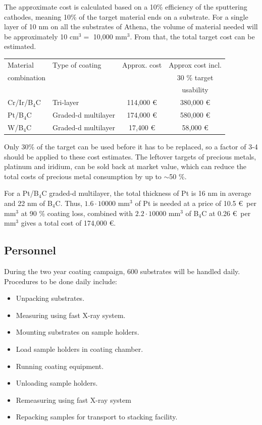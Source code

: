 The approximate cost is calculated based on a 10\% efficiency of the sputtering cathodes, meaning 10\% of the target material ends on a substrate. For a single layer of 10 nm on all the substrates of Athena, the volume of material needed will be approximately 10 cm$^3 = $ 10,000 mm$^3$. From that, the total target cost can be estimated.

\begin{table}[htbp]
	\centering
\begin{tabular}{l|l|c|c}
Material 	& Type of coating & Approx. cost & Approx cost incl. \\
combination	&	&	&	30 \% target \\
&	&	&	usability\\
\hline
\hline
Cr/Ir/B$_4$C & Tri-layer & 114,000 \euro & 380,000 \euro \\
\hline
Pt/B$_4$C & Graded-d multilayer & 174,000 \euro & 580,000 \euro\\
\hline
W/B$_4$C & Graded-d multilayer & 17,400 \euro & 58,000 \euro \\
\end{tabular}
\end{table}

Only 30\% of the target can be used before it has to be replaced, so a factor of 3-4 should be applied to these cost estimates. The leftover targets of precious metals, platinum and iridium, can be sold back at market value, which can reduce the total costs of precious metal consumption by up to $\sim$50 \%.

For a Pt/B$_4$C graded-d multilayer, the total thickness of Pt is 16 nm in average and 22 nm of B$_4$C. Thus, $1.6 \cdot 10000$ mm$^3$ of Pt is needed at a price of 10.5 \euro\ per mm$^3$ at 90 \% coating loss, combined with $2.2 \cdot 10000$ mm$^3$ of B$_4$C at 0.26 \euro\ per mm$^3$ gives a total cost of 174,000 \euro.

\subsection{Personnel}
During the two year coating campaign, 600 substrates will be handled daily. Procedures to be done daily include:

\begin{itemize}[itemsep=1.5pt,parsep=1pt]
	\item Unpacking substrates.
	\item Measuring using fast X-ray system.
	\item Mounting substrates on sample holders.
	\item Load sample holders in coating chamber.
	\item Running coating equipment.
	\item Unloading sample holders.
	\item Remeasuring using fast X-ray system
	\item Repacking samples for transport to stacking facility.
\end{itemize}

